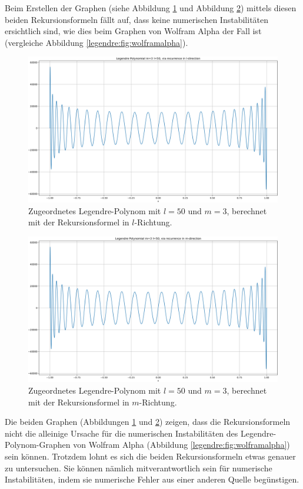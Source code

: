 Beim Erstellen der Graphen (siehe Abbildung \ref{legendre:fig:plot-l} und Abbildung \ref{legendre:fig:plot-m}) mittels diesen beiden Rekursionsformeln fällt auf, dass keine numerischen Instabilitäten ersichtlich sind, wie dies beim Graphen von Wolfram Alpha der Fall ist (vergleiche Abbildung \ref{legendre:fig:wolframalpha}).
\begin{figure}[!ht]
\centering
\includegraphics[width=1.0\linewidth]{papers/legendre/plots/plot_l_small.png}
\caption{Zugeordnetes Legendre-Polynom mit \texorpdfstring{$l=50$}{l=50} und \texorpdfstring{$m=3$}{m=3}, berechnet mit der Rekursionsformel in \texorpdfstring{$l$}{l}-Richtung.}
\label{legendre:fig:plot-l}
\end{figure}
\begin{figure}[!ht]
\centering
\includegraphics[width=1.0\linewidth]{papers/legendre/plots/plot_m_small.png}
\caption{Zugeordnetes Legendre-Polynom mit \texorpdfstring{$l=50$}{l=50} und \texorpdfstring{$m=3$}{m=3}, berechnet mit der Rekursionsformel in \texorpdfstring{$m$}{m}-Richtung.}
\label{legendre:fig:plot-m}
\end{figure}
Die beiden Graphen (Abbildungen \ref{legendre:fig:plot-l} und \ref{legendre:fig:plot-m}) zeigen, dass die Rekursionsformeln nicht die alleinige Ursache für die numerischen Instabilitäten des Legendre-Polynom-Graphen von Wolfram Alpha (Abbildung \ref{legendre:fig:wolframalpha}) sein können.
Trotzdem lohnt es sich die beiden Rekursionsformeln etwas genauer zu untersuchen.
Sie können nämlich mitverantwortlich sein für numerische Instabilitäten, indem sie numerische Fehler aus einer anderen Quelle begünstigen.
